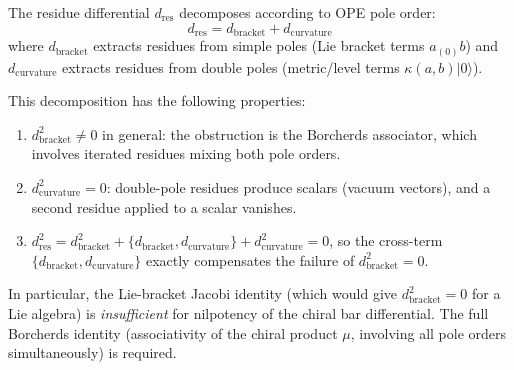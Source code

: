 \begin{proposition}\label{prop:pole-decomposition}
The residue differential $d_{\mathrm{res}}$ decomposes according to OPE pole order:
\begin{equation}\label{eq:pole-decomposition}
d_{\mathrm{res}} = d_{\mathrm{bracket}} + d_{\mathrm{curvature}}
\end{equation}
where $d_{\mathrm{bracket}}$ extracts residues from simple poles (Lie bracket terms $a_{(0)}b$) and $d_{\mathrm{curvature}}$ extracts residues from double poles (metric/level terms $\kappa(a,b)|0\rangle$).

This decomposition has the following properties:
\begin{enumerate}
\item $d_{\mathrm{bracket}}^2 \neq 0$ in general: the obstruction is the Borcherds associator, which involves iterated residues mixing both pole orders.
\item $d_{\mathrm{curvature}}^2 = 0$: double-pole residues produce scalars (vacuum vectors), and a second residue applied to a scalar vanishes.
\item $d_{\mathrm{res}}^2 = d_{\mathrm{bracket}}^2 + \{d_{\mathrm{bracket}}, d_{\mathrm{curvature}}\} + d_{\mathrm{curvature}}^2 = 0$, so the cross-term $\{d_{\mathrm{bracket}}, d_{\mathrm{curvature}}\}$ exactly compensates the failure of $d_{\mathrm{bracket}}^2 = 0$.
\end{enumerate}

In particular, the Lie-bracket Jacobi identity (which would give $d_{\mathrm{bracket}}^2 = 0$ for a Lie algebra) is \emph{insufficient} for nilpotency of the chiral bar differential.  The full Borcherds identity (associativity of the chiral product $\mu$, involving all pole orders simultaneously) is required.
\end{proposition}

